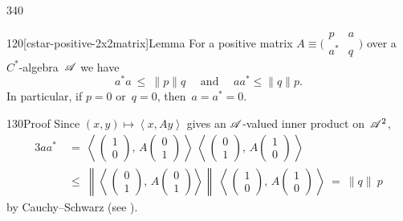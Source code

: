 \begin{parsec}{340}
\begin{point}{120}[cstar-positive-2x2matrix]{Lemma}
For a positive
matrix $A\equiv \bigl(\begin{smallmatrix} p & a \\ a^* & q
\end{smallmatrix}\bigr)$
over a $C^*$-algebra~$\mathscr{A}$
we have
\begin{equation*}
	a^*a\ \leq\  \|p\|q
	\quad\text{ and }\quad
	aa^*\leq \|q\|p.
\end{equation*}
In particular,
if $p=0$ or~$q=0$, then~$a=a^*=0$.
\begin{point}{130}{Proof}%
Since $(x,y)\mapsto \left<x,Ay\right>$
gives an $\mathscr{A}$-valued inner product
on~$\mathscr{A}^2$,
{
\newcommand\twovect[2]{%
\left(\begin{smallmatrix}#1\\#2\end{smallmatrix}\right)}
\newcommand\onezero{\twovect{1}{0}}
\newcommand\zeroone{\twovect{0}{1}}
\begin{alignat*}{3}
	aa^*
	\ &=\  \left<\,\onezero,\,A\zeroone\,\right> \ 
\left<\,\zeroone,\,A\onezero\,\right> \\
\ &\leq\  
\left\|\left<\,\zeroone,\,A\zeroone\right>\right\| \ 
\left<\,\onezero,\,A\onezero\,\right>
\ =\  \|q\|\  p
\end{alignat*}
}
by Cauchy--Schwarz (see ).


\end{point}
\end{point}
\end{parsec}
